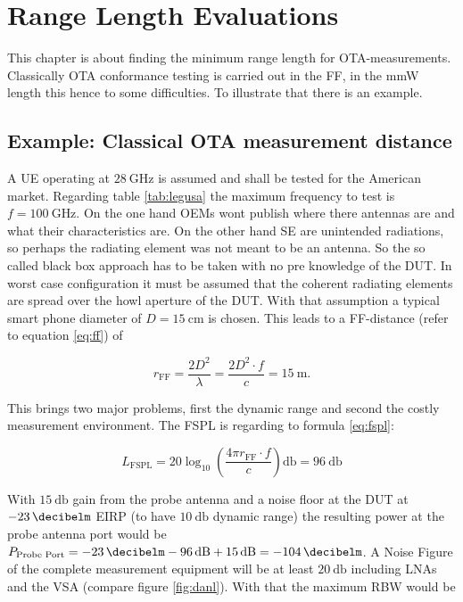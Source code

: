 \chapter{Range Length Evaluations}

This chapter is about finding the minimum range length for \ac{OTA}-measurements. Classically \ac{OTA} conformance testing is carried out in the \ac{FF}, in the \ac{mmW} length this hence to some difficulties. To illustrate that there is an example.

\section{Example: Classical OTA measurement distance}

A \ac{UE} operating at $\SI{28}{\giga\hertz}$ is assumed and shall be tested for the American market. Regarding table \ref{tab:legusa} the maximum frequency to test is $f = \SI{100}{\giga\hertz}$. On the one hand \acp{OEM} wont publish where there antennas are and what their characteristics are. On the other hand \ac{SE} are unintended radiations, so perhaps the radiating element was not meant to be an antenna. So the so called black box approach has to be taken with no pre knowledge of the \ac{DUT}. In worst case configuration it must be assumed that the coherent radiating elements are spread over the howl aperture of the \ac{DUT}. With that assumption a typical smart phone diameter of $D=\SI{15}{\centi\meter}$ is chosen. This leads to a \ac{FF}-distance (refer to equation \ref{eq:ff}) of 

\begin{equation}
r_{\text{FF}} = \frac{2D^2}{\lambda} = \frac{2D^2\cdot f}{c} = \SI{15}{\meter}.
\end{equation}

This brings two major problems, first the dynamic range and second the costly measurement environment. The \ac{FSPL} is regarding to formula \ref{eq:fspl}:

\begin{equation}
L_{\text{FSPL}} = 20\log_{10}\left(\frac{4\pi r_{\text{FF}} \cdot f}{c}\right)\si{\decibel} = \SI{96}{\decibel}
\end{equation}

With $\SI{15}{\decibel}$ gain from the probe antenna and a noise floor at the \ac{DUT} at $\SI{-23}{\decibelm}$ \ac{EIRP} (to have $\SI{10}{\decibel}$ dynamic range) the resulting power at the probe antenna port would be $P_{\text{Probe Port}} = \SI{-23}{\decibelm}-\SI{96}{\decibel}+\SI{15}{\decibel}=\SI{-104}{\decibelm}$. A Noise Figure of the complete measurement equipment will be at least $\SI{20}{\decibel}$ including \acp{LNA} and the \ac{VSA} (compare figure \ref{fig:danl}). With that the maximum \ac{RBW} would be 

